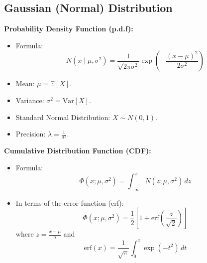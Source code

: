\subsection{Gaussian (Normal) Distribution}
\textbf{Probability Density Function (p.d.f):}
\begin{itemize}
    \item Formula: \[
    N(x \mid \mu, \sigma^2) = \frac{1}{\sqrt{2\pi\sigma^2}} \exp\left(-\frac{(x - \mu)^2}{2\sigma^2}\right)
    \]
    \item Mean: \(\mu = \mathbb{E}[X]\).
    \item Variance: \(\sigma^2 = \text{Var}[X]\).
    \item Standard Normal Distribution: \(X \sim N(0, 1)\).
    \item Precision: \(\lambda = \frac{1}{\sigma^2}\).
\end{itemize}
\textbf{Cumulative Distribution Function (CDF):}
\begin{itemize}
    \item Formula: \[
    \Phi(x; \mu, \sigma^2) = \int_{-\infty}^x N(z; \mu, \sigma^2) \, dz
    \]
    \item In terms of the error function (erf):
        \[
        \Phi(x; \mu, \sigma^2) = \frac{1}{2} \left[1 + \text{erf}\left(\frac{z}{\sqrt{2}}\right)\right]
        \]
        where \(z = \frac{x - \mu}{\sigma}\) and
        \[
        \text{erf}(x) = \frac{1}{\sqrt{\pi}} \int_0^x \exp(-t^2) \, dt
        \]
\end{itemize}







